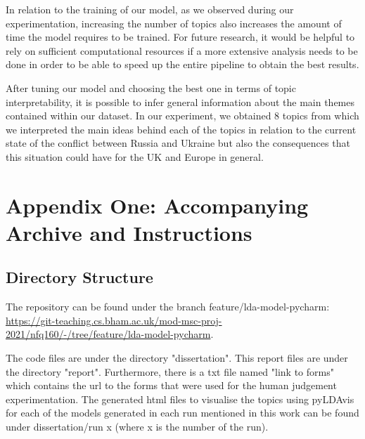 \documentclass[twoside,12pt,a4paper]{article}
\begin{document}
In relation to the training of our model, as we observed during our experimentation, increasing the number of topics also increases the amount of time the model requires to be trained. For future research, it would be helpful to rely on sufficient computational resources if a more extensive analysis needs to be done in order to be able to speed up the entire pipeline to obtain the best results.

After tuning our model and choosing the best one in terms of topic interpretability, it is possible to infer general information about the main themes contained within our dataset. In our experiment, we obtained 8 topics from which we interpreted the main ideas behind each of the topics in relation to the current state of the conflict between Russia and Ukraine but also the consequences that this situation could have for the UK and Europe in general.

\clearpage
\lhead{}\rhead{}
{}



\clearpage
\section{Appendix One: Accompanying Archive and Instructions}
\label{section:appendix}
\subsection{Directory Structure}
The repository can be found under the branch feature/lda-model-pycharm: \href{https://git-teaching.cs.bham.ac.uk/mod-msc-proj-2021/nfq160/-/tree/feature/lda-model-pycharm}{https://git-teaching.cs.bham.ac.uk/mod-msc-proj-2021/nfq160/-/tree/feature/lda-model-pycharm}.

The code files are under the directory "dissertation". This report files are under the directory "report". Furthermore, there is a txt file named "link to forms" which contains the url to the forms that were used for the human judgement experimentation. The generated html files to visualise the topics using pyLDAvis for each of the models generated in each run mentioned in this work can be found under dissertation/run x (where x is the number of the run).

\clearpage
\end{document}
